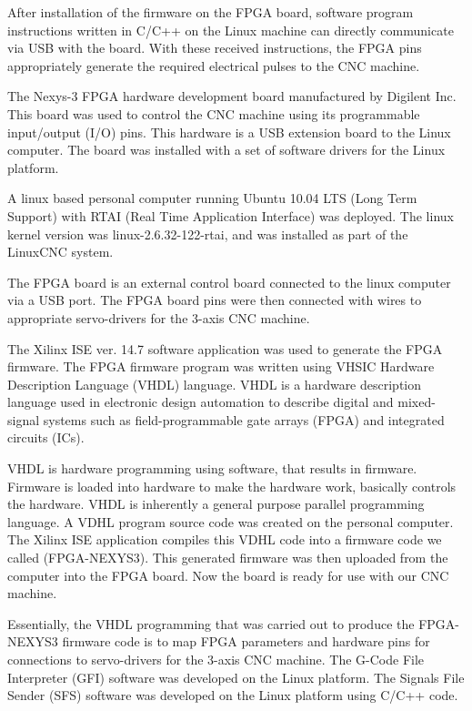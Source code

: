 After installation of the firmware on the FPGA board, software program instructions written in C/C++ on the Linux machine can directly communicate via USB with the board. With these received instructions, the FPGA pins appropriately generate the required electrical pulses to the CNC machine. 
\vspace*{1\baselineskip}

The Nexys-3 FPGA hardware development board manufactured by Digilent Inc. This board was used to control the CNC machine using its programmable input/output (I/O) pins. This hardware is a USB extension board to the Linux computer. The board was installed with a set of software drivers for the Linux platform.
\vspace*{1\baselineskip}

A linux based personal computer running Ubuntu 10.04 LTS (Long Term Support) with RTAI (Real Time Application Interface) was deployed. The linux kernel version was linux-2.6.32-122-rtai, and was installed as part of the LinuxCNC system.   
\vspace*{1\baselineskip}

The FPGA board is an external control board connected to the linux computer via a USB port. The FPGA board pins were then connected with wires to appropriate servo-drivers for the 3-axis CNC machine. 
\vspace*{1\baselineskip}

The Xilinx ISE ver. 14.7 software application was used to generate the FPGA firmware. The FPGA firmware program was written using VHSIC Hardware Description Language (VHDL) language. VHDL is a hardware description language used in electronic design automation to describe digital and mixed-signal systems such as field-programmable gate arrays (FPGA) and integrated circuits (ICs). 
\vspace*{1\baselineskip}

VHDL is hardware programming using software, that results in firmware. Firmware is loaded into hardware to make the hardware work, basically controls the hardware. VHDL is inherently a general purpose parallel programming language. A VDHL program source code was created on the personal computer. The Xilinx ISE application compiles this VDHL code into a firmware code we called (FPGA-NEXYS3). This generated firmware was then uploaded from the computer into the FPGA board. Now the board is ready for use with our CNC machine. 
\vspace*{1\baselineskip}

Essentially, the VHDL programming that was carried out to produce the FPGA-NEXYS3 firmware code is to map FPGA parameters and hardware pins for connections to servo-drivers for the 3-axis CNC machine. The G-Code File Interpreter (GFI) software was developed on the Linux platform. The Signals File Sender (SFS) software was developed on the Linux platform using C/C++ code. 
\vspace*{1\baselineskip}

